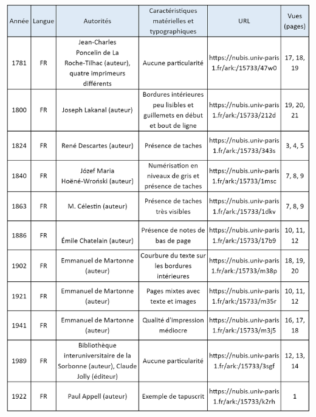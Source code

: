 \documentclass[a4paper,12pt,twoside]{book}
\begin{document}
\includegraphics[width=6in,height=8.31944in]{vertopal_157ae480aa4a4b07be198b586a812241/media/image22.png}
\end{document}
